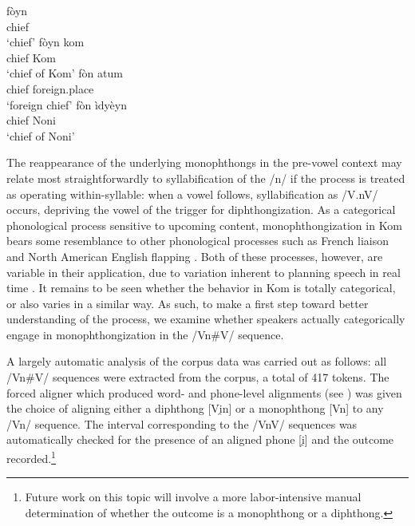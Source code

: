 \documentclass[output=paper,colorlinks,citecolor=brown
]{langscibook}
\begin{document}
\ea \label{ex:nasalexamples}
\begin{xlist}
\ex 
\gll fòyn \\
chief\\
\glt `chief'
\ex 
\gll fòyn kom \\
chief Kom\\
\glt `chief of Kom'
\ex 
\gll fòn atum \\
chief foreign.place \\
\glt `foreign chief'
\ex 
\gll fòn ìdyèyn \\
chief Noni \\
\glt `chief of Noni'
\end{xlist}
\z


The reappearance of the underlying monophthongs in the pre-vowel context may relate most straightforwardly to syllabification of the /n/ if the process is treated as operating within-syllable: when a vowel follows, syllabification as /V.nV/ occurs, depriving the vowel of the trigger for diphthongization. 
As a categorical phonological process sensitive to upcoming content, monophthongization in Kom bears some resemblance to other phonological processes such as French liaison \citep{kilbourn2016speech} and North American English flapping \citep{kilbourn2021variable}. 
Both of these processes, however, are variable in their application, due to variation inherent to planning speech in real time \citep{eddington2008phonetic, smolensky2020learning, kilbourn2021variable}. 
It remains to be seen whether the behavior in Kom is totally categorical, or also varies in a similar way. 
As such, to make a first step toward better understanding of the process, we examine whether speakers actually categorically engage in monophthongization in the /Vn\#V/ sequence. 

A largely automatic analysis of the corpus data was carried out as follows: all /Vn\#V/ sequences were extracted from the corpus, a total of 417 tokens. 
The forced aligner which produced word- and phone-level alignments (see ) was given the choice of aligning either a diphthong [Vi̯n] or a monophthong [Vn] to any /Vn/ sequence. 
The interval corresponding to the /VnV/ sequences was automatically checked for the presence of an aligned phone [i̯] and the outcome recorded.\footnote{Future work on this topic will involve a more labor-intensive manual determination of whether the outcome is a monophthong or a diphthong.}
\end{document}
